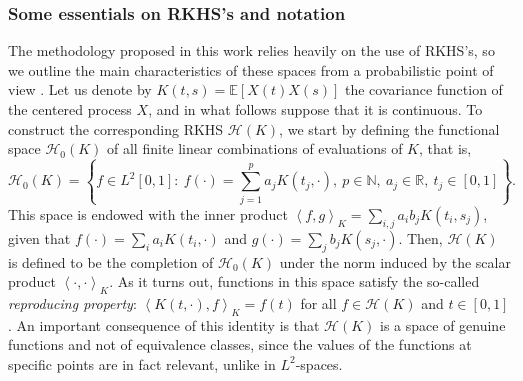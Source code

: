 \documentclass{article}
\numberwithin{equation}{section}
\theoremstyle{plain}
\theoremstyle{definition}
\newcommand{\N}{\mathbb{N}}
\newcommand{\R}{\mathbb{R}}
\newcommand{\Hcal}{\mathcal{H}}
\newcommand\dotprod[2]{\left\langle#1,#2\right\rangle}
\begin{document}
\subsubsection*{Some essentials on RKHS's and notation}\label{sec:rkhs}

The methodology proposed in this work relies heavily on the use of RKHS's, so we outline the main characteristics of these spaces from a probabilistic point of view \citep[for a more detailed account, see for example][]{berlinet2004reproducing}. Let us denote by \(K(t, s)= \mathbb E[X(t)X(s)]\) the covariance function of the centered process \(X\), and in what follows suppose that it is continuous. To construct the corresponding RKHS \(\Hcal(K)\), we start by defining the functional space \(\Hcal_0(K)\) of all finite linear combinations of evaluations of \(K\), that is,
\begin{equation}\label{eq:h0}
  \Hcal_0(K) = \left\{ f \in L^2[0,1]: \ f(\cdot) = \sum_{j=1}^p a_j K(t_j, \cdot), \ p \in \N, \ a_j \in \R, \ t_j \in [0, 1] \right\}.
\end{equation}
This space is endowed with the inner product \(\dotprod{f}{g}_K = \sum_{i, j} a_i b_j K(t_i, s_j)\), given that \(f(\cdot)=\sum_i a_i K(t_i, \cdot) \) and \(g(\cdot)=\sum_j b_j K(s_j, \cdot)\). Then, \(\Hcal(K)\) is defined to be the completion of \(\Hcal_0(K)\) under the norm induced by the scalar product \(\dotprod{\cdot}{\cdot}_K\). As it turns out, functions in this space satisfy the so-called \textit{reproducing property}: \(\dotprod{K(t, \cdot)}{f}_K = f(t)\) for all \(f \in \Hcal(K)\) and \(t \in [0, 1]\). An important consequence of this identity is that \(\Hcal(K)\) is a space of genuine functions and not of equivalence classes, since the values of the functions at specific points are in fact relevant, unlike in \(L^2\)-spaces.
\end{document}
